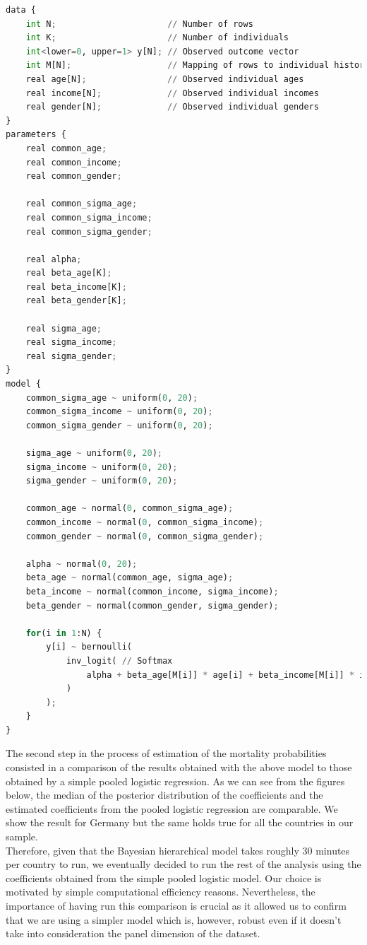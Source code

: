 \begin{lstlisting}[language=Python]
data {
    int N;                      // Number of rows
    int K;                      // Number of individuals
    int<lower=0, upper=1> y[N]; // Observed outcome vector
    int M[N];                   // Mapping of rows to individual history
    real age[N];                // Observed individual ages
    real income[N];             // Observed individual incomes
    real gender[N];             // Observed individual genders
}
parameters {
    real common_age;
    real common_income;
    real common_gender;

    real common_sigma_age;
    real common_sigma_income;
    real common_sigma_gender;

    real alpha;
    real beta_age[K];
    real beta_income[K];
    real beta_gender[K];

    real sigma_age;
    real sigma_income;
    real sigma_gender;
}
model {
    common_sigma_age ~ uniform(0, 20);
    common_sigma_income ~ uniform(0, 20);
    common_sigma_gender ~ uniform(0, 20);

    sigma_age ~ uniform(0, 20);
    sigma_income ~ uniform(0, 20);
    sigma_gender ~ uniform(0, 20);

    common_age ~ normal(0, common_sigma_age);
    common_income ~ normal(0, common_sigma_income);
    common_gender ~ normal(0, common_sigma_gender);

    alpha ~ normal(0, 20);
    beta_age ~ normal(common_age, sigma_age);
    beta_income ~ normal(common_income, sigma_income);
    beta_gender ~ normal(common_gender, sigma_gender);

    for(i in 1:N) {
        y[i] ~ bernoulli(
            inv_logit( // Softmax
                alpha + beta_age[M[i]] * age[i] + beta_income[M[i]] * income[i] + beta_gender[M[i]] * gender[i]
            )
        );
    }
}
\end{lstlisting}
\vspace{1cm}
The second step in the process of estimation of the mortality probabilities consisted in a comparison of the results obtained with the above model to those obtained by a simple pooled logistic regression. As we can see from the figures below, the median of the posterior distribution of the coefficients and the estimated coefficients from the pooled logistic regression are comparable. We show the result for Germany but the same holds true for all the countries in our sample.\\


Therefore, given that the Bayesian hierarchical model takes roughly 30 minutes per country to run, we eventually decided to run the rest of the analysis using the coefficients obtained from the simple pooled logistic model. Our choice is motivated by simple computational efficiency reasons. Nevertheless, the importance of having run this comparison is crucial as it allowed us to confirm that we are using a simpler model which is, however, robust even if it doesn't take into consideration the panel dimension of the dataset.\\

